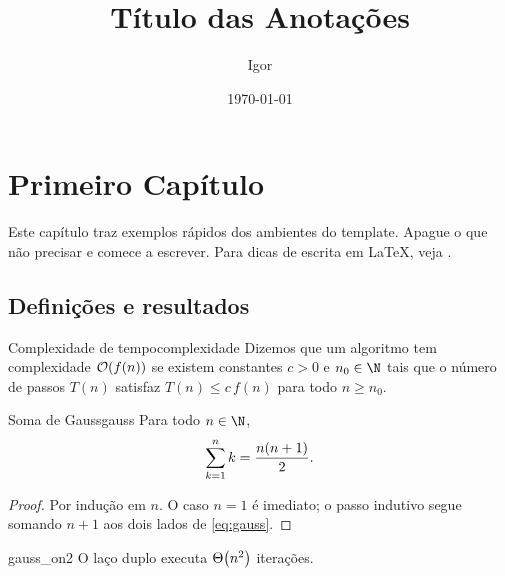 \documentclass[11pt,a4paper,oneside,openany]{book}
\title{Título das Anotações}
\author{Igor}
\date{\today}
\begin{document}
\frontmatter
\maketitle
\tableofcontents

\mainmatter

\chapter{Primeiro Capítulo}\label{cap:primeiro}

Este capítulo traz exemplos rápidos dos ambientes do template. Apague o que não
precisar e comece a escrever. Para dicas de escrita em \LaTeX, veja \cite{evanchen,gleave}.

\section{Definições e resultados}

\begin{definition}{Complexidade de tempo}{complexidade}
Dizemos que um algoritmo tem complexidade $\mathcal{O}\qty(f(n))$ se existem constantes
$c>0$ e $n_0\in\N$ tais que o número de passos $T(n)$ satisfaz $T(n)\le c\,f(n)$
para todo $n\ge n_0$.
\end{definition}

\begin{theorem}{Soma de Gauss}{gauss}
Para todo $n\in\N$,
\begin{equation}\label{eq:gauss}
    \sum_{k=1}^n k=\frac{n(n+1)}{2}.
\end{equation}
\end{theorem}
\begin{proof}
Por indução em $n$. O caso $n=1$ é imediato; o passo indutivo segue somando $n+1$
aos dois lados de \eqref{eq:gauss}.
\end{proof}

\begin{corollary}{}{gauss_on2}
O laço duplo  executa $\Theta\qty(n^2)$ iterações.
\end{corollary}
\end{document}
